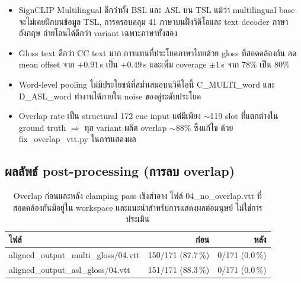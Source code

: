 \documentclass[11pt,a4paper]{article}
\def\texttt#1{#1}%
\def\textbf#1{#1}%
\begin{document}
\begin{itemize}[leftmargin=1.5em]
  \item \textbf{SignCLIP Multilingual ดีกว่าทั้ง BSL และ ASL บน TSL}
        แม้ว่า multilingual base จะไม่เคยฝึกบนข้อมูล TSL,
        การครอบคลุม 41 ภาษาบนฝั่งวิดีโอและ text decoder ภาษาอังกฤษ
        ถ่ายโอนได้ดีกว่า variant เฉพาะภาษาทั้งสอง
  \item \textbf{Gloss text ดีกว่า CC text มาก}
        การแทนที่ประโยคภาษาไทยด้วย gloss ที่สอดคล้องกัน
        ลด mean offset จาก $+0.91$\,s เป็น $+0.49$\,s
        และเพิ่ม coverage $\pm 1$\,s จาก 78\% เป็น 80\%
  \item \textbf{Word-level pooling ไม่มีประโยชน์ที่สม่ำเสมอบนวิดีโอนี้}
        \texttt{C\_MULTI\_word} และ \texttt{D\_ASL\_word} ทำงานได้ภายใน noise
        ของคู่ระดับประโยค
  \item \textbf{Overlap rate เป็น structural}
        172 cue input แต่มีเพียง $\sim$119 slot ที่แตกต่างใน ground truth
        $\Rightarrow$ ทุก variant ผลิต overlap $\sim$88\% ซึ่งแก้ไข
        ด้วย \texttt{fix\_overlap\_vtt.py} ในการแสดงผล
\end{itemize}

\subsection{ผลลัพธ์ post-processing (การลบ overlap)}
\begin{table}[h]
\centering
\small
\begin{tabular}{lrr}
\toprule
\textbf{ไฟล์} & \textbf{ก่อน} & \textbf{หลัง} \\
\midrule
\texttt{aligned\_output\_multi\_gloss/04.vtt}      & 150/171 (87.7\,\%) & \textbf{0/171 (0.0\,\%)} \\
\texttt{aligned\_output\_asl\_gloss/04.vtt}        & 151/171 (88.3\,\%) & \textbf{0/171 (0.0\,\%)} \\
\bottomrule
\end{tabular}
\caption{Overlap ก่อนและหลัง clamping pass เชิงสำอาง
ไฟล์ \texttt{04\_no\_overlap.vtt} ที่สอดคล้องกันมีอยู่ใน workspace
และแนะนำสำหรับการแสดงผลต่อมนุษย์ ไม่ใช่การประเมิน}
\label{tab:overlap-postproc}
\end{table}
\end{document}
